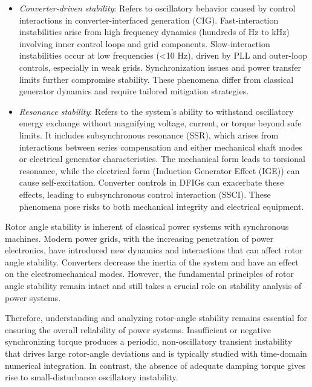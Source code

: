   
\begin{itemize}
    \item \textit{Converter-driven stability}: Refers to oscillatory behavior caused by control interactions in converter-interfaced generation (CIG). 
    Fast-interaction instabilities arise from high frequency dynamics (hundreds of Hz to kHz) involving inner control loops and grid components. 
    Slow-interaction instabilities occur at low frequencies (<10 Hz), driven by PLL and outer-loop controls, especially 
    in weak grids. Synchronization issues and power transfer limits further compromise stability. 
    These phenomena differ from classical generator dynamics and require tailored mitigation strategies.
    \item \textit{Resonance stability}: Refers to the system's ability to withstand oscillatory 
    energy exchange without magnifying voltage, current, or torque beyond safe limits. It includes subsynchronous 
    resonance (SSR), which arises from interactions between series compensation and either mechanical shaft modes or 
    electrical generator characteristics. The mechanical form leads to torsional resonance, while the electrical 
    form (Induction Generator Effect (IGE)) can cause self-excitation. Converter controls in DFIGs can exacerbate these 
    effects, leading to subsynchronous control interaction (SSCI). These phenomena pose risks to both mechanical integrity 
    and electrical equipment.
\end{itemize}


Rotor angle stability is inherent of classical power systems with synchronous machines. Modern power grids, with the increasing penetration of 
power electronics, have introduced new dynamics and interactions that can affect rotor angle stability. Converters decrease the inertia of the system
and have an effect on the electromechanical modes. However, the fundamental principles of rotor angle stability remain intact and still takes
a crucial role on stability analysis of power systems.

Therefore, understanding and analyzing rotor-angle stability remains essential for ensuring the overall reliability of power systems. 
Insufficient or negative synchronizing torque produces a periodic, non-oscillatory transient instability that drives large rotor-angle deviations
and is typically studied with time-domain numerical integration. In contrast, the absence of adequate damping torque gives rise to small-disturbance
oscillatory instability.

